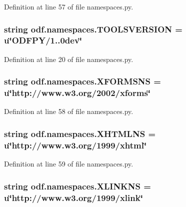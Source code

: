 Definition at line 57 of file namespaces.\+py.

\hypertarget{namespaceodf_1_1namespaces_a736381c711ff84b4eb1438250d37c47c}{
\subsubsection[{T\+O\+O\+L\+S\+V\+E\+R\+S\+I\+O\+N}]{\setlength{\rightskip}{0pt plus 5cm}string odf.\+namespaces.\+T\+O\+O\+L\+S\+V\+E\+R\+S\+I\+O\+N = u\char`\"{}O\+D\+F\+P\+Y/1..\+0dev\char`\"{}}}\label{namespaceodf_1_1namespaces_a736381c711ff84b4eb1438250d37c47c}


Definition at line 20 of file namespaces.\+py.

\hypertarget{namespaceodf_1_1namespaces_aab47b5215a420501e95ca654941c2676}{
\subsubsection[{X\+F\+O\+R\+M\+S\+N\+S}]{\setlength{\rightskip}{0pt plus 5cm}string odf.\+namespaces.\+X\+F\+O\+R\+M\+S\+N\+S = u\char`\"{}http\+://www.\+w3.\+org/2002/xforms\char`\"{}}}\label{namespaceodf_1_1namespaces_aab47b5215a420501e95ca654941c2676}


Definition at line 58 of file namespaces.\+py.

\hypertarget{namespaceodf_1_1namespaces_a7b93ea22de258448c3a1a6953fa428b9}{
\subsubsection[{X\+H\+T\+M\+L\+N\+S}]{\setlength{\rightskip}{0pt plus 5cm}string odf.\+namespaces.\+X\+H\+T\+M\+L\+N\+S = u\char`\"{}http\+://www.\+w3.\+org/1999/xhtml\char`\"{}}}\label{namespaceodf_1_1namespaces_a7b93ea22de258448c3a1a6953fa428b9}


Definition at line 59 of file namespaces.\+py.

\hypertarget{namespaceodf_1_1namespaces_a8ba6bb05d0fd8d856ffdc2c7667aa5a3}{
\subsubsection[{X\+L\+I\+N\+K\+N\+S}]{\setlength{\rightskip}{0pt plus 5cm}string odf.\+namespaces.\+X\+L\+I\+N\+K\+N\+S = u\char`\"{}http\+://www.\+w3.\+org/1999/xlink\char`\"{}}}\label{namespaceodf_1_1namespaces_a8ba6bb05d0fd8d856ffdc2c7667aa5a3}


